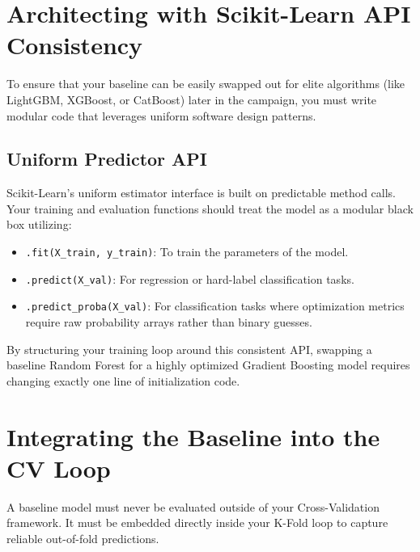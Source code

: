 \documentclass{article}
\begin{document}
\section{Architecting with Scikit-Learn API Consistency}
To ensure that your baseline can be easily swapped out for elite algorithms (like LightGBM, XGBoost, or CatBoost) later in the campaign, you must write modular code that leverages uniform software design patterns.

\subsection{Uniform Predictor API}
Scikit-Learn’s uniform estimator interface is built on predictable method calls. Your training and evaluation functions should treat the model as a modular black box utilizing:
\begin{itemize}
    \item \texttt{.fit(X\_train, y\_train)}: To train the parameters of the model.
    \item \texttt{.predict(X\_val)}: For regression or hard-label classification tasks.
    \item \texttt{.predict\_proba(X\_val)}: For classification tasks where optimization metrics require raw probability arrays rather than binary guesses.
\end{itemize}

By structuring your training loop around this consistent API, swapping a baseline Random Forest for a highly optimized Gradient Boosting model requires changing exactly one line of initialization code.

\section{Integrating the Baseline into the CV Loop}
A baseline model must never be evaluated outside of your Cross-Validation framework. It must be embedded directly inside your K-Fold loop to capture reliable out-of-fold predictions.
\end{document}
